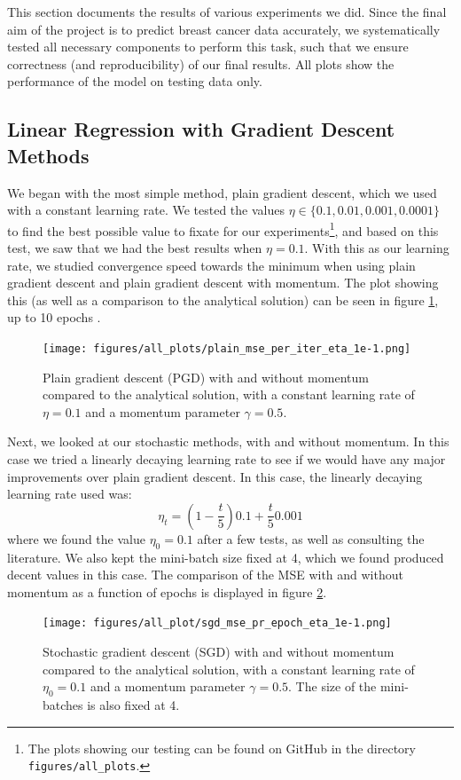 This section documents the results of various experiments we did. Since the final aim of the
project is to predict breast cancer data accurately, we systematically tested all necessary components to perform this task, such that we ensure correctness (and reproducibility) of our final results. All plots show the performance of the model on testing data only.

\subsection{Linear Regression with Gradient Descent Methods}
We began with the most simple method, plain gradient descent, which we used with a constant learning rate. We tested the values $\eta \in \{ 0.1, 0.01, 0.001, 0.0001\}$ to find the best possible value to fixate for our experiments\footnote{The plots showing our testing can be found on GitHub in the directory \texttt{figures/all\_plots}.}, and based on this test, we saw that we had the best results when $\eta = 0.1$. With this as our learning rate, we studied convergence speed towards the minimum when using plain gradient descent and plain gradient descent with momentum. The plot showing this (as well as a comparison to the analytical solution) can be seen in figure \ref{fig:plainVSanalytical}, up to 10 epochs \cite{mediumEpochNumber}\cite{epochsBreastCancerArticle}.
\begin{figure}
    \centering
    \texttt{[image: figures/all\_plots/plain\_mse\_per\_iter\_eta\_1e-1.png]}
    \caption{Plain gradient descent (PGD) with and without momentum compared to the analytical solution, with a constant learning rate of $\eta = 0.1$ and a momentum parameter $\gamma = 0.5$.}
    \label{fig:plainVSanalytical}
\end{figure}

Next, we looked at our stochastic methods, with and without momentum. In this case we tried a linearly decaying learning rate to see if we would have any major improvements over plain gradient descent. In this case, the linearly decaying learning rate used was:
\[
\eta_t = (1- \frac{t}{5})0.1 + \frac{t}{5} 0.001
\]
where we found the value $\eta_0 = 0.1$ after a few tests, as well as consulting the literature. We also kept the mini-batch size fixed at 4, which we found produced decent values in this case. The comparison of the MSE with and without momentum as a function of epochs is displayed in figure \ref{fig:sgdVSanalytical}. 
\begin{figure}
    \centering
    \texttt{[image: figures/all\_plot/sgd\_mse\_pr\_epoch\_eta\_1e-1.png]}
    \caption{Stochastic gradient descent (SGD) with and without momentum compared to the analytical solution, with a constant learning rate of $\eta_0 = 0.1$ and a momentum parameter $\gamma = 0.5$. The size of the mini-batches is also fixed at 4.}
    \label{fig:sgdVSanalytical}
\end{figure}

